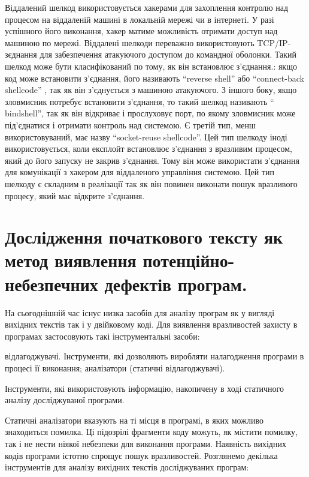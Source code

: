 Віддалений шелкод використовується хакерами для захоплення контролю над процесом на віддаленій машині в локальній мережі чи в інтернеті. У разі успішного його виконання, хакер матиме можливість отримати доступ над машиною по мережі. Віддалені шелкоди переважно використовують  TCP/IP-зєднання для забезпечення атакуючого доступом до командної оболонки. Такий шелкод може бути класифікований по тому, як він встановлює з’єднання.: якщо код може встановити з’єднання, його називають ``reverse shell'' або “connect-back shellcode”
, так як він з’єднується з машиною атакуючого. З іншого боку, якщо зловмисник потребує встановити з’єднання, то такий шелкод називають “ bindshell”, так як він відкриває і прослуховує порт, по якому зловмисник може під’єднатися і отримати контроль над системою. Є третій тип, менш використовуваний, має назву “socket-reuse shellcode”. Цей тип шелкоду іноді використовується, коли експлойт встановлює з’єднання з вразливим процесом, який до його запуску не закрив з’єднання. Тому він може використати з’єднання для комунікації з хакером для віддаленого управління системою. Цей тип шелкоду є складним в реалізації так як він повинен виконати пошук вразливого процесу, який має відкрите з’єднання.


\section{Дослідження початкового тексту як метод виявлення потенційно-небезпечних дефектів програм.}
\label{1section:id3}
На сьогоднішній час існує низка засобів для аналізу програм як у вигляді вихідних текстів так і у двійковому коді.
Для виявлення вразливостей захисту в програмах застосовують такі інструментальні засоби:
\begin{itemize}
 відлагоджувачі. Інструменти, які дозволяють виробляти налагодження програми в процесі її виконання;
 аналізатори (статичні відлагоджувачі).
\end{itemize}

Інструменти, які використовують інформацію, накопичену в ході статичного аналізу досліджуваної програми.

Статичні аналізатори вказують на ті місця в програмі, в яких можливо знаходиться помилка. Ці підозрілі фрагменти коду можуть, як містити помилку, так і не нести ніякої небезпеки для виконання програми. Наявність вихідних кодів програми істотно спрощує пошук вразливостей.
Розглянемо декілька інструментів для аналізу вихідних текстів досліджуваних програм:

